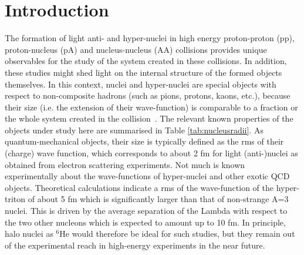\documentclass[a4paper,11pt]{scrartcl} %
\begin{document}
\section{Introduction} 
The formation of light anti- and hyper-nuclei in high energy proton-proton (pp), proton-nucleus (pA) and nucleus-nucleus (AA) collisions provides unique observables for the study of the system created in these collisions. In addition, these studies might shed light on the internal structure of the formed objects themselves. 
In this context, nuclei and hyper-nuclei are special objects with respect to non-composite hadrons (such as pions, protons, kaons, etc.), because their size (i.e. the extension of their wave-function) is comparable to a fraction or the whole system created in the collision~\cite{Adam:2015vna}.  
The relevant known properties of the objects under study here are summarised in Table \ref{tab:nucleusradii}.
As quantum-mechanical objects, their size is typically defined as the rms of their (charge) wave function, which corresponds to about 2 fm for light (anti-)nuclei as obtained from electron scattering experiments. Not much is known experimentally about the wave-functions of hyper-nuclei and other exotic QCD objects. Theoretical calculations indicate a rms of the wave-function of the hyper-triton of about 5 fm which is significantly larger than that of non-strange A=3 nuclei. This is driven by the average separation of the Lambda with respect to the two other nucleons which is expected to amount up to 10 fm. In principle, halo nuclei as $^{6}$He would therefore be ideal for such studies, but they remain out of the experimental reach in high-energy experiments in the near future.
\end{document}
